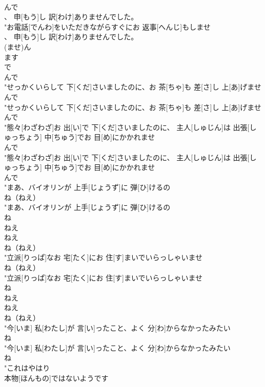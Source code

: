 \documentclass[8pt]{extreport}
\begin{document}
\begin{CJK}{UTF8}{min}
\\	んで
\\	、 申[もう]し 訳[わけ]ありませんでした。
\\	"お電話[でんわ]をいただきながらすぐにお 返事[へんじ]もしませ
\\	、 申[もう]し 訳[わけ]ありませんでした。
\\	(ませ)ん 
\\	ます 
\\	で	
\\	んで
\\	"せっかくいらして 下[くだ]さいましたのに、お 茶[ちゃ]も 差[さ]し 上[あ]げませ
\\	んで
\\	"せっかくいらして 下[くだ]さいましたのに、お 茶[ちゃ]も 差[さ]し 上[あ]げませ
\\	んで
\\	"態々[わざわざ]お 出[い]で 下[くだ]さいましたのに、 主人[しゅじん]は 出張[しゅっちょう] 中[ちゅう]でお 目[め]にかかれませ
\\	んで
\\	"態々[わざわざ]お 出[い]で 下[くだ]さいましたのに、 主人[しゅじん]は 出張[しゅっちょう] 中[ちゅう]でお 目[め]にかかれませ
\\	んで
\\	"まあ、バイオリンが 上手[じょうず]に 弾[ひ]けるの
\\	ね（ねえ）
\\	"まあ、バイオリンが 上手[じょうず]に 弾[ひ]けるの
\\	ね 
\\	ねえ 
\\	ねえ 
\\	ね（ねえ）
\\	"立派[りっぱ]なお 宅[たく]にお 住[す]まいでいらっしゃいませ
\\	ね（ねえ）
\\	"立派[りっぱ]なお 宅[たく]にお 住[す]まいでいらっしゃいませ
\\	ね 
\\	ねえ 
\\	ねえ 
\\	ね（ねえ）
\\	"今[いま] 私[わたし]が 言[い]ったこと、よく 分[わ]からなかったみたい
\\	ね
\\	"今[いま] 私[わたし]が 言[い]ったこと、よく 分[わ]からなかったみたい
\\	ね
\\	"これはやはり
\\	本物[ほんもの]ではないようです

\end{CJK}
\end{document}

